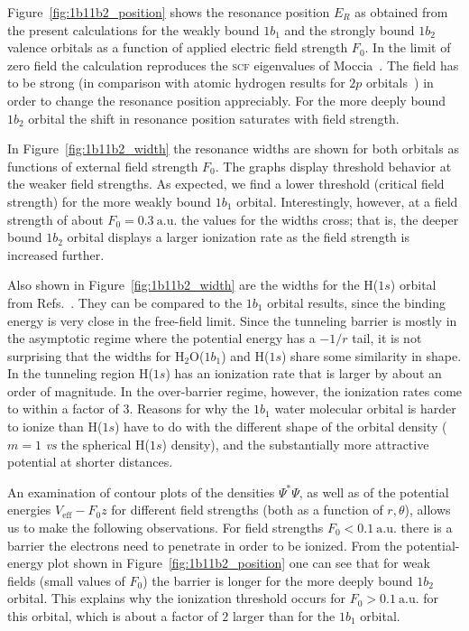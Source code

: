 Figure~\ref{fig:1b11b2_position} shows the resonance position $E_{R}$
as obtained from the present calculations for the weakly bound
$1b_{1}$ and the strongly bound $1b_{2}$ valence orbitals as a
function of applied electric field strength $F_{0}$. In the limit of
zero field the calculation reproduces the \textsc{scf} eigenvalues of
Moccia~\cite{Moccia_1964}. The field has to be strong (in comparison
with atomic hydrogen results for $2p$ orbitals~\cite{Telnov_1989}) in
order to change the resonance position appreciably. For the more
deeply bound $1b_{2}$ orbital the shift in resonance position
saturates with field strength.

In Figure~\ref{fig:1b11b2_width} the resonance widths are shown for
both orbitals as functions of external field strength $F_{0}$. The
graphs display threshold behavior at the weaker field strengths. As
expected, we find a lower threshold (critical field strength) for the
more weakly bound $1b_{1}$ orbital. Interestingly, however, at a field
strength of about $F_{0} = 0.3\ \mathrm{a.u.}$ the values for the
widths cross; that is, the deeper bound $1b_{2}$ orbital displays a
larger ionization rate as the field strength is increased further.

Also shown in Figure~\ref{fig:1b11b2_width} are the widths for the
H($1s$) orbital from Refs.~\cite{Telnov_1989,Kolosov_1987}. They can
be compared to the $1b_{1}$ orbital results, since the binding energy
is very close in the free-field limit. Since the tunneling barrier is
mostly in the asymptotic regime where the potential energy has a
$-1/r$ tail, it is not surprising that the widths for
H$_{2}$O($1b_{1}$) and H($1s$) share some similarity in shape. In the
tunneling region H($1s$) has an ionization rate that is larger by
about an order of magnitude. In the over-barrier regime, however, the
ionization rates come to within a factor of 3. Reasons for why the
$1b_1$ water molecular orbital is harder to ionize than H($1s$) have
to do with the different shape of the orbital density ($m=1$ \emph{vs}
the spherical H($1s$) density), and the substantially more attractive
potential at shorter distances.

An examination of contour plots of the densities $\Psi^{*}\Psi$, as
well as of the potential energies $V_{\mathrm{eff}} - F_{0}z$ for
different field strengths (both as a function of $r,\theta$), allows
us to make the following observations. For field strengths $F_{0} <
0.1\ \mathrm{a.u.}$ there is a barrier the electrons need to penetrate
in order to be ionized. From the potential-energy plot shown in
Figure~\ref{fig:1b11b2_position} one can see that for weak fields
(small values of $F_{0}$) the barrier is longer for the more deeply
bound $1b_{2}$ orbital. This explains why the ionization threshold
occurs for $F_{0} > 0.1\ \mathrm{a.u.}$ for this orbital, which is
about a factor of $2$ larger than for the $1b_{1}$ orbital.

